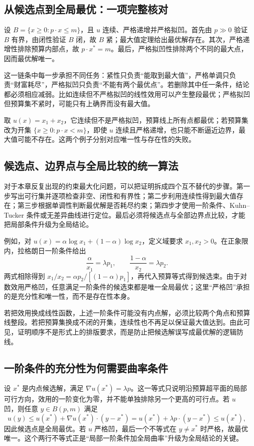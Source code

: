 \subsection{从候选点到全局最优：一项完整核对}
设 $B=\{x\ge0:p\cdot x\le m\}$，且 $u$ 连续、严格递增并严格拟凹。首先由 $p\gg0$ 验证 $B$ 有界，由闭性验证 $B$ 闭，故 $B$ 紧；最大值定理给出最优解存在。其次，严格递增性排除预算内部点，故 $p\cdot x^*=m$。最后，严格拟凹性排除两个不同的最大点，因而最优解唯一。

这一链条中每一步承担不同任务：紧性只负责“能取到最大值”，严格单调只负责“财富耗尽”，严格拟凹只负责“不能有两个最优点”。若删除其中任一条件，结论都必须相应减弱。比如连续但不严格拟凹的线性效用可以产生整段最优；严格拟凹但预算集不紧时，可能只有上确界而没有最大值。

\begin{example}[两项假设的逐项删去]
取 $u(x)=x_1+x_2$，它连续但不是严格拟凹，预算线上所有点都最优；若预算集改为开集 $\{x\ge0:p\cdot x<m\}$，即使 $u$ 连续且严格递增，也只能不断逼近边界，最大值可能不存在。这两个例子分别对应唯一性与存在性的失败。
\end{example}

\subsection{候选点、边界点与全局比较的统一算法}
对于本章反复出现的约束最大化问题，可以把证明拆成四个互不替代的步骤。第一步写出可行集并逐项检查非空、闭性和有界性；第二步利用连续性得到最大值存在；第三步根据单调性判断最优解是否耗尽约束；第四步才使用一阶条件、Kuhn--Tucker 条件或无差异曲线进行定位。最后必须将候选点与全部边界点比较，才能把局部条件升级为全局结论。

例如，对 $u(x)=\alpha\log x_1+(1-\alpha)\log x_2$，定义域要求 $x_1,x_2>0$。在正象限内，拉格朗日一阶条件给出
\[
\frac{\alpha}{x_1}=\lambda p_1,\qquad
\frac{1-\alpha}{x_2}=\lambda p_2.
\]
两式相除得到 $x_1/x_2=\alpha p_2/[(1-\alpha)p_1]$，再代入预算等式得到候选束。由于对数效用严格凹，任意满足一阶条件的候选束都是唯一全局最优；这里“严格凹”承担的是充分性和唯一性，而不是存在性本身。

若把效用换成线性函数，上述一阶条件可能没有内点解，必须比较两个角点和预算线整段。若把预算集换成不闭的开集，连续性也不再足以保证最大值达到。由此可见，证明顺序不是形式上的排版要求，而是防止把候选解误写成最优解的逻辑防线。

\subsection{一阶条件的充分性为何需要曲率条件}
设 $x^*$ 是内点候选解，满足 $\nabla u(x^*)=\lambda p$。这一等式只说明沿预算超平面的局部可行方向，效用的一阶变化为零，并不能单独排除另一个更高的可行点。若 $u$ 凹，则任意 $y\in B(p,m)$ 满足
\[
 u(y)\le u(x^*)+\nabla u(x^*)\cdot(y-x^*)
 =u(x^*)+\lambda p\cdot(y-x^*)\le u(x^*),
\]
因此候选点是全局最优。若 $u$ 严格凹，最后一个不等式在 $y\ne x^*$ 时严格，故最优唯一。这个两行不等式正是“局部一阶条件加全局曲率”升级为全局结论的关键。

